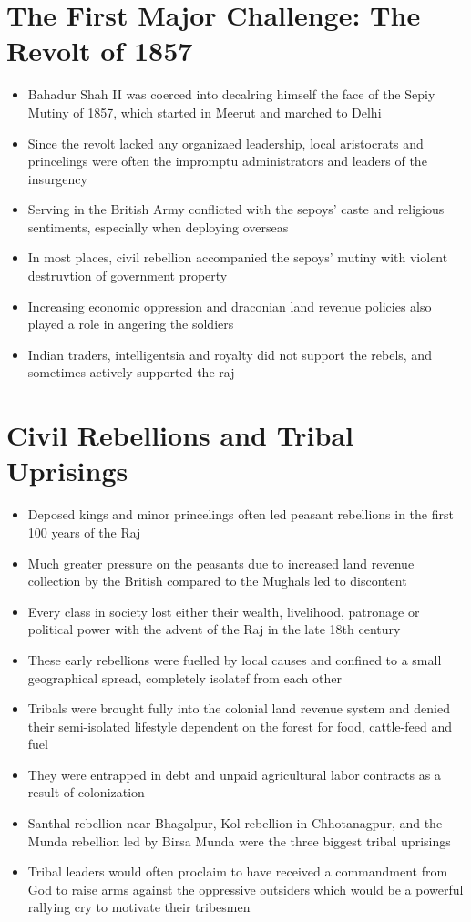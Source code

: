 \section{The First Major Challenge: The Revolt of 1857}
\begin{itemize}
    \item Bahadur Shah II was coerced into decalring himself the face of the Sepiy Mutiny of 1857, which started in Meerut and marched to Delhi
    \item Since the revolt lacked any organizaed leadership, local aristocrats and princelings were often the impromptu administrators and leaders of the insurgency
    \item Serving in the British Army conflicted with the sepoys' caste and religious sentiments, especially when deploying overseas
    \item In most places, civil rebellion accompanied the sepoys' mutiny with violent destruvtion of government property
    \item Increasing economic oppression and draconian land revenue policies also played a role in angering the soldiers
    \item Indian traders, intelligentsia and royalty did not support the rebels, and sometimes actively supported the \Gls{raj}
\end{itemize}

\section{Civil Rebellions and Tribal Uprisings}
\begin{itemize}
    \item Deposed kings and minor princelings often led peasant rebellions in the first 100 years of the Raj
    \item Much greater pressure on the peasants due to increased land revenue collection by the British compared to the Mughals led to discontent
    \item Every class in society lost either their wealth, livelihood, patronage or political power with the advent of the Raj in the late 18th century
    \item These early rebellions were fuelled by local causes and confined to a small geographical spread, completely isolatef from each other
    \item Tribals were brought fully into the colonial land revenue system and denied their semi-isolated lifestyle dependent on the forest for food, cattle-feed and fuel
    \item They were entrapped in debt and unpaid agricultural labor contracts as a result of colonization
    \item Santhal rebellion near Bhagalpur, Kol rebellion in Chhotanagpur, and the Munda rebellion led by Birsa Munda were the three biggest tribal uprisings
    \item Tribal leaders would often proclaim to have received a commandment from God to raise arms against the oppressive outsiders which would be a powerful rallying cry to motivate their tribesmen
\end{itemize}

